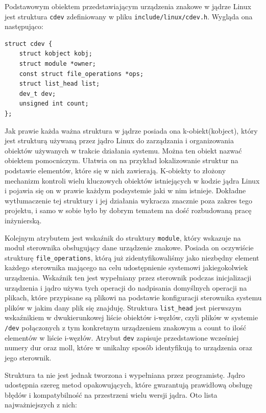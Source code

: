 \documentclass[11pt]{scrartcl}
\begin{document}
Podstawowym obiektem przedstawiającym urządzenia znakowe w jądrze Linux jest struktura \texttt{cdev} zdefiniowany w pliku \texttt{include/linux/cdev.h}. Wygląda ona następująco:

\begin{verbatim}
struct cdev {
    struct kobject kobj;
    struct module *owner;
    const struct file_operations *ops;
    struct list_head list;
    dev_t dev;
    unsigned int count;
};
\end{verbatim}

Jak prawie każda ważna struktura w jądrze posiada ona k-obiekt(kobject), który jest strukturą używaną przez jądro Linux do zarządzania i organizowania obiektów używanych w trakcie działania systemu. Można ten obiekt nazwać obiektem pomocniczym. Ułatwia on na przykład lokalizowanie struktur na podstawie elementów, które się w nich zawierają. K-obiekty to złożony mechanizm kontroli wielu kluczowych obiektów istniejących w kodzie jądra Linux i pojawia się on w prawie każdym podsystemie jaki w nim istnieje. Dokładne wytłumaczenie tej struktury i jej działania wykracza znacznie poza zakres tego projektu, i samo w sobie było by dobrym tematem na dość rozbudowaną pracę inżynierską.

Kolejnym atrybutem jest wskaźnik do struktury \texttt{module}, który wskazuje na moduł sterownika obsługujący dane urządzenie znakowe.  Posiada on oczywiście strukturę \texttt{file\_operations}, którą już zidentyfikowaliśmy jako niezbędny element każdego sterownika mającego na celu udostępnienie systemowi jakiegokolwiek urządzenia. Wskaźnik ten jest wypełniany przez sterownik podczas inicjalizacji urządzenia i jądro używa tych operacji do nadpisania domyślnych operacji na plikach, które przypisane są plikowi na podstawie konfiguracji sterownika systemu plików w jakim dany plik się znajduję. Struktura \texttt{list\_head} jest pierwszym wskaźnikiem w dwukierunkowej liście obiektów i-węzłów, czyli plików w systemie \texttt{/dev} połączonych z tym konkretnym urządzeniem znakowym a count to ilość elementów w liście i-węzłów.  Atrybut \texttt{dev} zapisuje przedstawione wcześniej numery dur oraz moll, które w unikalny sposób identyfikują to urządzenia oraz jego sterownik.

Struktura ta nie jest jednak tworzona i wypełniana przez programistę.  Jądro udostępnia szereg metod opakowujących, które gwarantują prawidłową obsługę błędów i kompatybilność na przestrzeni wielu wersji jądra. Oto lista najważniejszych z nich:
\end{document}
